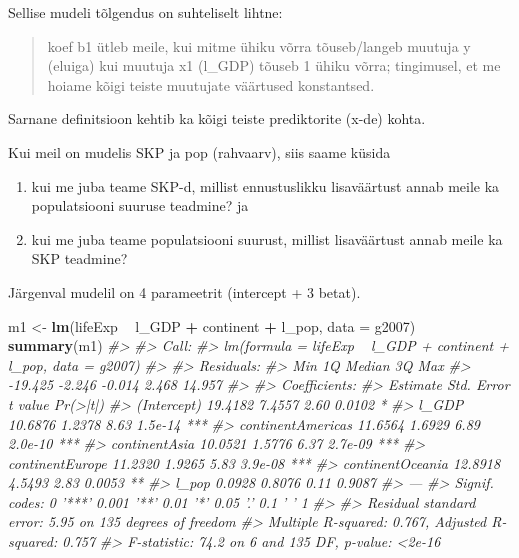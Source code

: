 \documentclass[]{book}
\newenvironment{Shaded}{\begin{snugshade}}{\end{snugshade}}
\newcommand{\CommentTok}[1]{\textcolor[rgb]{0.56,0.35,0.01}{\textit{#1}}}
\newcommand{\DataTypeTok}[1]{\textcolor[rgb]{0.13,0.29,0.53}{#1}}
\newcommand{\KeywordTok}[1]{\textcolor[rgb]{0.13,0.29,0.53}{\textbf{#1}}}
\newcommand{\NormalTok}[1]{#1}
\newcommand{\OperatorTok}[1]{\textcolor[rgb]{0.81,0.36,0.00}{\textbf{#1}}}
\newcommand{\StringTok}[1]{\textcolor[rgb]{0.31,0.60,0.02}{#1}}
\begin{document}
Sellise mudeli tõlgendus on suhteliselt lihtne:

\begin{quote}
koef b1 ütleb meile,
kui mitme ühiku võrra tõuseb/langeb muutuja y (eluiga)
kui muutuja x1 (l\_GDP) tõuseb 1 ühiku võrra;
tingimusel, et me hoiame kõigi teiste muutujate väärtused konstantsed.
\end{quote}

Sarnane definitsioon kehtib ka kõigi teiste prediktorite (x-de) kohta.

Kui meil on mudelis SKP ja pop (rahvaarv), siis saame küsida

\begin{enumerate}
\def\labelenumi{\arabic{enumi})}
\item
  kui me juba teame SKP-d, millist ennustuslikku lisaväärtust annab meile ka populatsiooni suuruse teadmine? ja
\item
  kui me juba teame populatsiooni suurust, millist lisaväärtust annab meile ka SKP teadmine?
\end{enumerate}

Järgenval mudelil on 4 parameetrit (intercept + 3 betat).

\begin{Shaded}
\begin{Highlighting}[]
\NormalTok{m1 <-}\StringTok{ }\KeywordTok{lm}\NormalTok{(lifeExp }\OperatorTok{~}\StringTok{ }\NormalTok{l_GDP }\OperatorTok{+}\StringTok{ }\NormalTok{continent }\OperatorTok{+}\StringTok{ }\NormalTok{l_pop, }\DataTypeTok{data =}\NormalTok{ g2007)}
\KeywordTok{summary}\NormalTok{(m1)}
\CommentTok{#> }
\CommentTok{#> Call:}
\CommentTok{#> lm(formula = lifeExp ~ l_GDP + continent + l_pop, data = g2007)}
\CommentTok{#> }
\CommentTok{#> Residuals:}
\CommentTok{#>     Min      1Q  Median      3Q     Max }
\CommentTok{#> -19.425  -2.246  -0.014   2.468  14.957 }
\CommentTok{#> }
\CommentTok{#> Coefficients:}
\CommentTok{#>                   Estimate Std. Error t value Pr(>|t|)    }
\CommentTok{#> (Intercept)        19.4182     7.4557    2.60   0.0102 *  }
\CommentTok{#> l_GDP              10.6876     1.2378    8.63  1.5e-14 ***}
\CommentTok{#> continentAmericas  11.6564     1.6929    6.89  2.0e-10 ***}
\CommentTok{#> continentAsia      10.0521     1.5776    6.37  2.7e-09 ***}
\CommentTok{#> continentEurope    11.2320     1.9265    5.83  3.9e-08 ***}
\CommentTok{#> continentOceania   12.8918     4.5493    2.83   0.0053 ** }
\CommentTok{#> l_pop               0.0928     0.8076    0.11   0.9087    }
\CommentTok{#> ---}
\CommentTok{#> Signif. codes:  0 '***' 0.001 '**' 0.01 '*' 0.05 '.' 0.1 ' ' 1}
\CommentTok{#> }
\CommentTok{#> Residual standard error: 5.95 on 135 degrees of freedom}
\CommentTok{#> Multiple R-squared:  0.767,  Adjusted R-squared:  0.757 }
\CommentTok{#> F-statistic: 74.2 on 6 and 135 DF,  p-value: <2e-16}
\end{Highlighting}
\end{Shaded}
\end{document}
